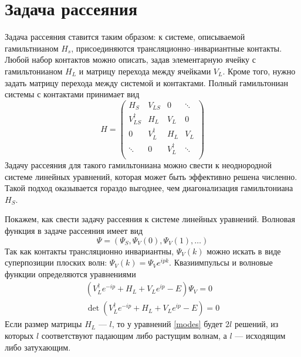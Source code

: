 \section{Задача рассеяния}
\label{app:kwant}
Задача рассеяния ставится таким образом:
к системе, описываемой гамильтнианом $H_s$, присоединяются трансляционно--инвариантные 
контакты. Любой набор контактов можно описать, задав элементарную ячейку с гамильтонианом 
$H_L$ и матрицу перехода между ячейками $V_L$. Кроме того, нужно задать матрицу перехода
между системой и контактами. Полный гамильтониан системы с контактами
принимает вид
\begin{equation}
    H = \begin{pmatrix}
            H_S             & V_{LS}     & 0           & \ddots \\
            V_{LS}^\dagger  & H_L        & V_L         & 0  \\
            0               & V_L^\dagger& H_L         & V_L    \\
            \ddots          & 0          & V_L^\dagger & \ddots \\
        \end{pmatrix}
\end{equation}
Задачу рассеяния для такого гамильтониана можно свести к неоднородной системе линейных 
уравнений, которая может быть эффективно решена численно. Такой подход оказывается 
гораздо выгоднее, чем диагонализация гамильтониана $H_S$. 

Покажем, как свести задачу рассеяния к системе линейных уравнений. 
Волновая функция в задаче рассеяния имеет вид 
\begin{equation}
    \Psi = (\Psi_S, \Psi_V(0), \Psi_V(1), \dots)
\end{equation}
Так как контакты трансляционно инвариантны, $\Psi_V(k)$ можно искать в виде суперпозиции
плоских волн: $\Psi_V(k) = \Psi_V e^{ipk}$. Квазиимпульсы и волновые функции определяются 
уравнениями
\begin{equation}
    \label{modes}
    \begin{gathered}
        (V_L^\dagger e^{-ip} + H_L + V_L e^{ip} - E) \Psi_V = 0\\
        \det{(V_L^\dagger e^{-ip} + H_L + V_L e^{ip} - E)} = 0
    \end{gathered}
\end{equation}
Если размер матрицы $H_L$ --- $l$, то у уравнений \eqref{modes} будет $2l$ решений, из 
которых $l$ соответствуют падающим либо растущим волнам, а $l$ --- исходящим либо 
затухающим.

